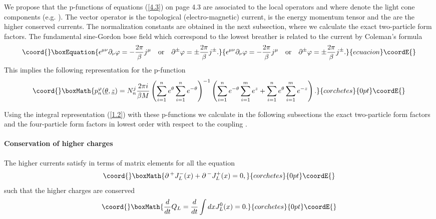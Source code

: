 \documentclass[a4paper,a4paper]{article}
\begin{document}
We propose that the p-functions of equations (\ref{4.3}) on page \pageref
{4.3} are associated to the local operators \coordHE{} and \coordHE{}
where \myHighlight{$\pm $}\coordHE{} denote the light cone components (e.g. \coordHE{}%
). The vector operator \coordHE{} is the topological (electro-magnetic)
current, \coordHE{} is the energy momentum tensor and the \coordHE{} are the higher conserved currents. The normalization constants are
obtained in the next subsection, where we calculate the exact two-particle
form factors. The fundamental sine-Gordon bose field \coordHE{} which
correspond to the lowest breather is related to the current by Coleman's
formula \cite{Co} 
\begin{equation}\coord{}\boxEquation{
\epsilon ^{\mu \nu }\partial _{\nu }\varphi =-\frac{2\pi }{\beta }j^{\mu
}\quad \text{or}\quad \partial ^{\pm }\varphi =\pm \frac{2\pi }{\beta }
j^{\pm }.  \label{4.4}
}{
\epsilon ^{\mu \nu }\partial _{\nu }\varphi =-\frac{2\pi }{\beta }j^{\mu
}\quad \text{or}\quad \partial ^{\pm }\varphi =\pm \frac{2\pi }{\beta }
j^{\pm }.  }{ecuacion}\coordE{}\end{equation}
This implies the following representation for the p-function 
\[\coord{}\boxMath{
p_{n}^{\varphi }(\underline{\theta },\underline{z})=N_{n}^{j}\frac{2\pi i}{%
\beta M}\left( \sum_{i=1}^{n}e^{\theta }\sum_{i=1}^{n}e^{-\theta }\right)
^{-1}\left( \sum_{i=1}^{n}e^{-\theta
}\sum_{i=1}^{m}e^{z}+\sum_{i=1}^{n}e^{\theta }\sum_{i=1}^{m}e^{-z}\right) . 
}{corchetes}{0pt}\coordE{}\]

Using the integral representation (\ref{1.2}) with these p-functions we
calculate in the following subsections the exact two-particle form factors
and the four-particle form factors in lowest order with respect to the
coupling \coordHE{}.

\paragraph{Conservation of higher charges}

The higher currents satisfy in terms of matrix elements \coordHE{} for all \coordHE{} the equation 
\[\coord{}\boxMath{
\partial \,^{+}J_{L}^{-}(x)+\partial \,^{-}J_{L}^{+}(x)=0, 
}{corchetes}{0pt}\coordE{}\]
such that the higher charges are conserved 
\[\coord{}\boxMath{
\frac{d}{dt}Q_{L}=\frac{d}{dt}\int dxJ_{L}^{0}(x)=0. 
}{corchetes}{0pt}\coordE{}\]
\end{document}
